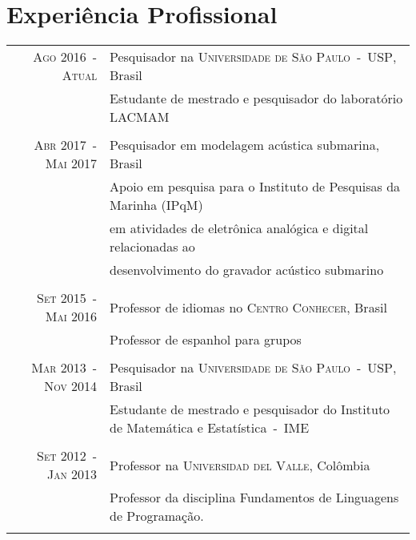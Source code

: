 \documentclass[a4paper,10pt]{article}
\begin{document}
\section{Experiência Profissional}
\begin{longtable}{rl}

    \textsc{Ago 2016~-~Atual}       & Pesquisador na \textsc{Universidade de São Paulo~-~USP}, Brasil \\
                                    &\footnotesize{Estudante de mestrado e pesquisador do laboratório LACMAM} \\
                                    &\\

    \textsc{Abr 2017~-~Mai 2017}    & Pesquisador em modelagem acústica submarina, Brasil \\
                                    &\footnotesize{Apoio em pesquisa para o Instituto de Pesquisas da Marinha (IPqM)} \\
                                    &\footnotesize{em atividades de eletrônica analógica e digital relacionadas ao} \\
                                    &\footnotesize{desenvolvimento do gravador acústico submarino} \\
                                    &\\

    \textsc{Set 2015~-~Mai 2016}    & Professor de idiomas no \textsc{Centro Conhecer}, Brasil \\
                                    &\footnotesize{Professor de espanhol para grupos} \\
                                    &\\

    \textsc{Mar 2013~-~Nov 2014}    & Pesquisador na \textsc{Universidade de São Paulo~-~USP}, Brasil \\
                                    &\footnotesize{Estudante de mestrado e pesquisador do Instituto de Matemática e Estatística~-~IME} \\
                                    &\\

    \textsc{Set 2012~-~Jan 2013}    & Professor na \textsc{Universidad del Valle}, Colômbia \\
                                    &\footnotesize{Professor da disciplina Fundamentos de Linguagens de Programação.} \\
                                    &\\


\end{longtable}
\end{document}
